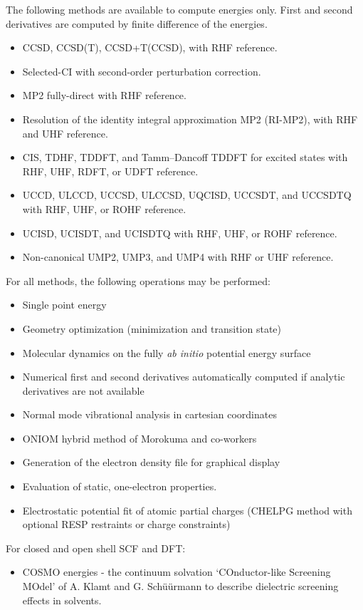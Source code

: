 The following methods are available to compute energies only.  First
and second derivatives are computed by finite difference of the
energies.
\begin{itemize}
\item CCSD, CCSD(T), CCSD+T(CCSD), with RHF reference.
\item Selected-CI with second-order perturbation correction.
\item MP2 fully-direct with RHF reference.
\item Resolution of the identity integral approximation MP2 (RI-MP2), with
  RHF and UHF reference.
\item CIS, TDHF, TDDFT, and Tamm--Dancoff TDDFT for excited states with RHF, UHF, RDFT, or UDFT reference.
\item UCCD, ULCCD, UCCSD, ULCCSD, UQCISD, UCCSDT, and UCCSDTQ with RHF, UHF, or ROHF reference.
\item UCISD, UCISDT, and UCISDTQ with RHF, UHF, or ROHF reference.
\item Non-canonical UMP2, UMP3, and UMP4 with RHF or UHF reference.
\end{itemize}

For all methods, the following operations may be performed:
\begin{itemize}
\item Single point energy
\item Geometry optimization (minimization and transition state)
\item Molecular dynamics on the fully {\em ab initio} potential energy
  surface
\item Numerical first and second derivatives automatically computed if
  analytic derivatives are not available
\item Normal mode vibrational analysis in cartesian coordinates
\item ONIOM hybrid method of Morokuma and co-workers
\item Generation of the electron density file for graphical display
\item Evaluation of static, one-electron properties.
\item Electrostatic potential fit of atomic partial charges (CHELPG method with
    optional RESP restraints or charge constraints)
\end{itemize}

For closed and open shell SCF and DFT:
\begin{itemize}
\item COSMO energies - the continuum solvation `COnductor-like Screening MOdel'
    of A. Klamt and G. Sch\"{u}\"{u}rmann to describe dielectric screening effects in
    solvents.
\end{itemize}

